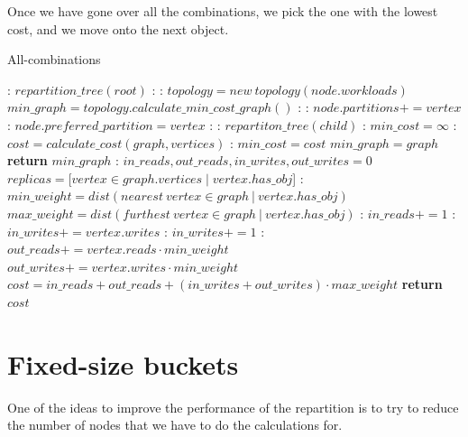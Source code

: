 Once we have gone over all the combinations, we pick the one with the lowest cost, and we move onto the next object.

\begin{algorithm}
  \caption{All-combinations}\label{alg:all-combinations}
  \begin{algorithmic}[1]
  :
  \State $repartition\_tree(root)$
  \EndFunction
  :
    :
      \State $topology = new\ topology(node.workloads)$
      \State $min\_graph =  topology.calculate\_min\_cost\_graph()$
      :
        :
        \State $node.partitions += vertex$
          :
            \State $node.preferred\_partition = vertex$
          \EndIf
        \EndIf
      \EndFor
    \EndIf
    :
      :
        \State $repartiton\_tree(child)$
        \EndFor
    \EndIf
    \EndFunction
    :
    \State $min\_cost = \infty$
      :
        \State $cost = calculate\_cost(graph, vertices)$
        :
          \State $min\_cost = cost$
          \State $min\_graph = graph$
        \EndIf
      \EndFor
    \State \textbf{return} $min\_graph$
    \EndFunction
    :
      \State $in\_reads, out\_reads, in\_writes, out\_writes = 0$
      \State $replicas = [vertex \in graph.vertices \mid vertex.has\_obj$]
      :
      \State $min\_weight = dist(nearest\ vertex \in graph\ |\  vertex.has\_obj)$
      \State $max\_weight = dist(furthest\ vertex \in graph\ |\ vertex.has\_obj)$
        :
          \State $in\_reads+= 1$
          :
          \State $in\_writes+= vertex.writes$
          \Else:
          \State  $in\_writes+= 1 $
          \EndIf
        \Else:
          \State $out\_reads += vertex.reads \cdot min\_weight$
          \State $out\_writes += vertex.writes \cdot min\_weight$
        \EndIf
      \EndFor
      \State $cost = in\_reads+ out\_reads + (in\_writes+ out\_writes) \cdot max\_weight$
      \State \textbf{return} $cost$
  \EndFunction
  \end{algorithmic}
  \end{algorithm}

\section{Fixed-size buckets}\label{sec:fixed-size buckets}
One of the ideas to improve the performance of the repartition is to try to reduce the number of nodes that we have to do the calculations for.

